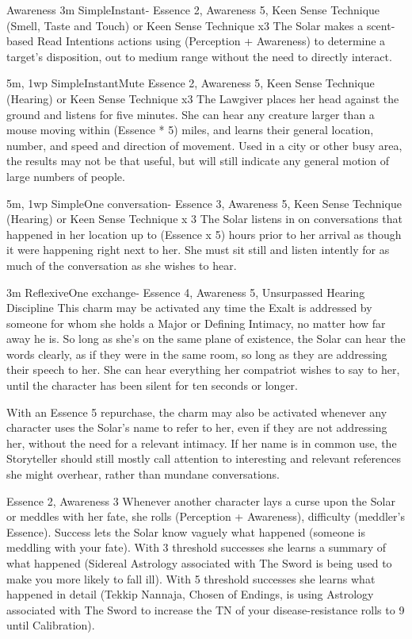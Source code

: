 \begin{Ability}{Awareness}
  {3m}
  {Simple}{Instant}{-}
  {Essence 2, Awareness 5, Keen Sense Technique (Smell, Taste and Touch) or Keen Sense Technique x3}
  The Solar makes a scent-based Read Intentions actions using (Perception + Awareness) to determine a target's disposition, out to medium range without the need to directly interact.

  {5m, 1wp}
  {Simple}{Instant}{Mute}
  {Essence 2, Awareness 5, Keen Sense Technique (Hearing) or Keen Sense Technique x3}
  The Lawgiver places her head against the ground and listens for five minutes. She can hear any creature larger than a mouse moving within (Essence * 5) miles, and learns their general location, number, and speed and direction of movement. Used in a city or other busy area, the results may not be that useful, but will still indicate any general motion of large numbers of people.

  {5m, 1wp}
  {Simple}{One conversation}{-}
  {Essence 3, Awareness 5, Keen Sense Technique (Hearing) or Keen Sense Technique x 3}
  The Solar listens in on conversations that happened in her location up to (Essence x 5) hours prior to her arrival as though it were happening right next to her. She must sit still and listen intently for as much of the conversation as she wishes to hear.

  {3m}
  {Reflexive}{One exchange}{-}
  {Essence 4, Awareness 5, Unsurpassed Hearing Discipline}
  This charm may be activated any time the Exalt is addressed by someone for whom she holds a Major or Defining Intimacy, no matter how far away he is. So long as she's on the same plane of existence, the Solar can hear the words clearly, as if they were in the same room, so long as they are addressing their speech to her. She can hear everything her compatriot wishes to say to her, until the character has been silent for ten seconds or longer.

  With an Essence 5 repurchase, the charm may also be activated whenever any character uses the Solar's name to refer to her, even if they are not addressing her, without the need for a relevant intimacy. If her name is in common use, the Storyteller should still mostly call attention to interesting and relevant references she might overhear, rather than mundane conversations.

  {Essence 2, Awareness 3}
  Whenever another character lays a curse upon the Solar or meddles with her fate, she rolls (Perception + Awareness), difficulty (meddler's Essence). Success lets the Solar know vaguely what happened (someone is meddling with your fate). With 3 threshold successes she learns a summary of what happened (Sidereal Astrology associated with The Sword is being used to make you more likely to fall ill). With 5 threshold successes she learns what happened in detail (Tekkip Nannaja, Chosen of Endings, is using Astrology associated with The Sword to increase the TN of your disease-resistance rolls to 9 until Calibration).


\end{Ability}
